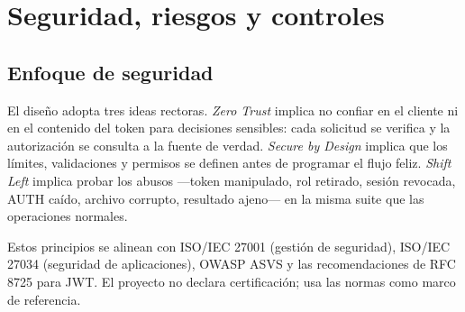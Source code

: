 \documentclass[11pt,a4paper]{article}
\newcommand{\term}[1]{\textit{#1}}
\begin{document}
\section{Seguridad, riesgos y controles}

\subsection{Enfoque de seguridad}

El diseño adopta tres ideas rectoras. \term{Zero Trust} implica no confiar en el
cliente ni en el contenido del token para decisiones sensibles: cada solicitud se
verifica y la autorización se consulta a la fuente de verdad. \term{Secure by
Design} implica que los límites, validaciones y permisos se definen antes de
programar el flujo feliz. \term{Shift Left} implica probar los abusos ---token
manipulado, rol retirado, sesión revocada, AUTH caído, archivo corrupto, resultado
ajeno--- en la misma suite que las operaciones normales.

Estos principios se alinean con ISO/IEC 27001 (gestión de seguridad),
ISO/IEC 27034 (seguridad de aplicaciones), OWASP ASVS y las recomendaciones de
RFC 8725 para JWT. El proyecto no declara certificación; usa las normas como marco
de referencia.
\end{document}
